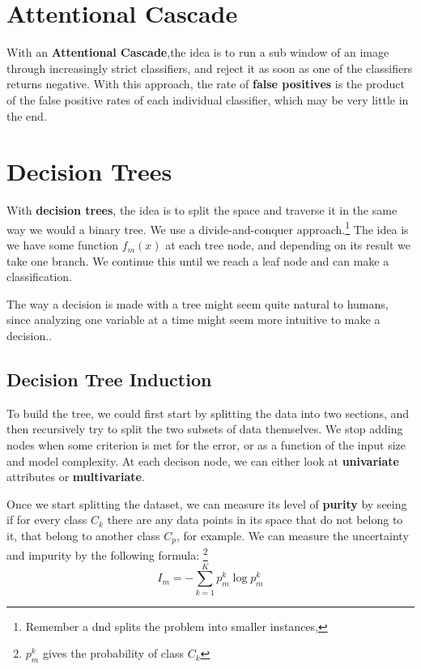 \documentclass{tufte-handout}
\begin{document}
\section{Attentional Cascade}
With an \textbf{Attentional Cascade},the idea is to run a sub window of an image through increasingly strict
classifiers, and reject it as soon as one of the classifiers returns negative. With this approach, the rate
of \textbf{false positives} is the product of the false positive rates of each individual classifier, which may
be very little in the end.
\section{Decision Trees}
With \textbf{decision trees}, the idea is to split the space and traverse it in the same way we would a binary tree.
We use a divide-and-conquer approach.\footnote{Remember a dnd splits the problem into smaller instances, }
The idea is we have some function $f_{m}(x)$ at each tree node, and depending on its result we take one branch. 
We continue this until we reach a leaf node and can make a classification.

The way a decision is made with a tree might seem quite natural to humans, since analyzing one 
variable at a time might seem more intuitive to make a decision..
\subsection{Decision Tree Induction}
To build the tree, we could first start by splitting the data into two sections, and then recursively try to 
split the two subsets of data themselves. We stop adding nodes when some criterion is met for the error, or 
as a function of the input size and  model complexity. At each decison node, we can either look at
\textbf{univariate} attributes or \textbf{multivariate}.

Once we start splitting the dataset, we can measure its level of \textbf{purity} by seeing if for every class
$C_{k}$ there are any data points in its space that do not belong to it, that belong to another class $C_{p}$,
for example. We can measure the uncertainty and impurity by the following formula: \footnote{$p_{m}^{k}$ gives
the probability of class $C_{k}$}
\[ I_{m} = - \sum_{k = 1}^{K} p_{m}^{k} \log p_{m}^{k}\]
\end{document}
